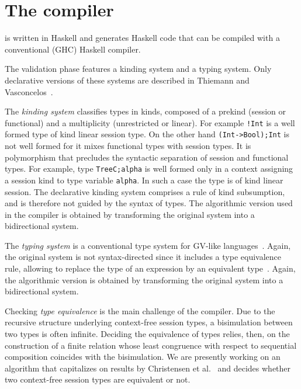 \section{The \freest{} compiler}
\label{sec:compiler}

\freest{} is written in Haskell and generates Haskell code that can be
compiled with a conventional (GHC) Haskell compiler.

The validation phase features a kinding system and a typing
system. Only declarative versions of these systems are described in
Thiemann and Vasconcelos~\cite{DBLP:conf/icfp/ThiemannV16}.

The \emph{kinding system} classifies types in kinds, composed of a
prekind (session or functional) and a multiplicity (unrestricted or
linear). For example \lstinline|!Int| is a well formed type of kind
linear session type. On the other hand \lstinline|(Int->Bool);Int| is
not well formed for it mixes functional types with session types.
%
It is polymorphism that precludes the syntactic separation of session
and functional types. For example, type \lstinline|TreeC;alpha| is
well formed only in a context assigning a session kind to type
variable \lstinline|alpha|. In such a case the type is of kind linear
session.
%
The declarative kinding system comprises a rule of kind subsumption,
and is therefore not guided by the syntax of types. The algorithmic
version used in the compiler is obtained by transforming the original
system into a bidirectional system.

The \emph{typing system} is a conventional type system for GV-like
languages~\cite{DBLP:journals/jfp/GayV10}. Again, the original system
is not syntax-directed since it includes a type equivalence rule,
allowing to replace the type of an expression by an equivalent
type~\cite{DBLP:conf/icfp/ThiemannV16}. Again, the algorithmic version
is obtained by transforming the original system into a bidirectional
system.

Checking \emph{type equivalence} is the main challenge of the
compiler. Due to the recursive structure underlying context-free 
session types, a bisimulation between two types is often infinite. 
Deciding the equivalence of types relies, then, on the construction 
of a finite relation whose least congruence with respect to  
sequential composition coincides with the bisimulation. We are 
presently working on an algorithm that capitalizes on results by 
Christensen et al.~\cite{DBLP:journals/iandc/ChristensenHS95} and 
decides whether two context-free session types are equivalent or not.  

